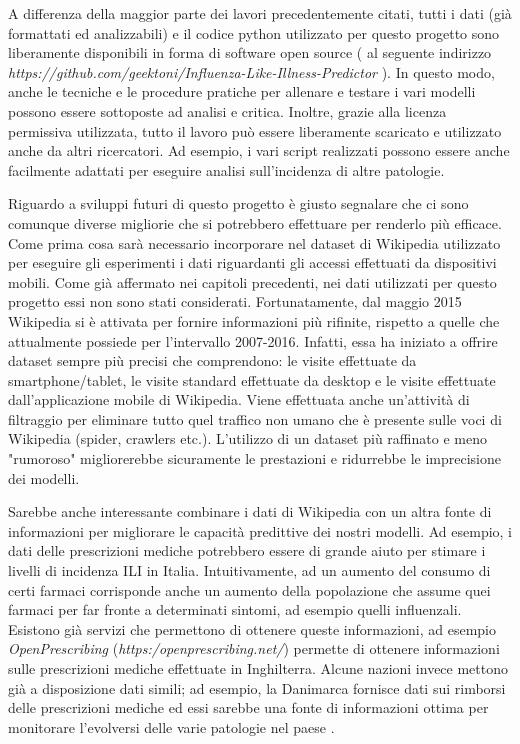 A differenza della maggior parte dei lavori precedentemente citati, tutti i dati (già formattati ed analizzabili) e il codice 
python utilizzato per questo progetto sono liberamente disponibili in forma di software open source ( al seguente 
indirizzo \textit{https://github.com/geektoni/Influenza-Like-Illness-Predictor} ). In questo modo, 
anche le tecniche e le procedure pratiche per allenare e testare i vari modelli possono essere sottoposte ad analisi e 
critica. Inoltre, grazie alla licenza permissiva utilizzata, tutto il lavoro può essere liberamente scaricato e utilizzato 
anche da altri ricercatori. Ad esempio, i vari script realizzati possono essere anche facilmente adattati per eseguire
analisi sull'incidenza di altre patologie.
\bigskip

Riguardo a sviluppi futuri di questo progetto è giusto segnalare che ci sono comunque diverse migliorie che si potrebbero 
effettuare per renderlo più efficace. Come prima cosa sarà necessario incorporare nel dataset di 
Wikipedia utilizzato per eseguire gli esperimenti i dati riguardanti gli accessi effettuati da dispositivi mobili. 
Come già affermato nei capitoli precedenti, nei dati utilizzati per questo progetto essi non sono stati considerati. 
Fortunatamente, dal maggio 2015 Wikipedia si è attivata per fornire informazioni più rifinite, rispetto a quelle che 
attualmente possiede per l'intervallo 2007-2016. Infatti, essa ha iniziato a offrire dataset sempre più precisi che 
comprendono: le visite effettuate da smartphone/tablet, le visite standard effettuate da desktop e le visite 
effettuate dall'applicazione mobile di Wikipedia. Viene effettuata anche un'attività di filtraggio per eliminare tutto quel 
traffico non umano che è presente sulle voci di Wikipedia (spider, crawlers etc.). L'utilizzo di un dataset più raffinato e 
meno "rumoroso" migliorerebbe sicuramente le prestazioni e ridurrebbe le imprecisione dei modelli. 
\bigskip

Sarebbe anche interessante combinare i dati di Wikipedia con un altra fonte di informazioni per migliorare le capacità 
predittive dei nostri modelli. Ad esempio, i dati delle prescrizioni mediche potrebbero essere di grande aiuto per stimare i 
livelli di incidenza ILI in Italia. Intuitivamente, ad un aumento del consumo di certi farmaci corrisponde anche un aumento 
della popolazione che assume quei farmaci per far fronte a determinati sintomi, ad esempio quelli influenzali. Esistono già 
servizi che permettono di ottenere queste informazioni, ad esempio \textit{OpenPrescribing} 
(\textit{https:/openprescribing.net/}) permette di ottenere informazioni sulle prescrizioni mediche effettuate in 
Inghilterra. Alcune nazioni invece mettono già a disposizione dati simili; ad esempio, la Danimarca fornisce dati sui 
rimborsi delle prescrizioni mediche ed essi sarebbe una fonte di informazioni ottima per monitorare l'evolversi delle varie 
patologie nel paese \cite{sigrun2012}.
\bigskip

